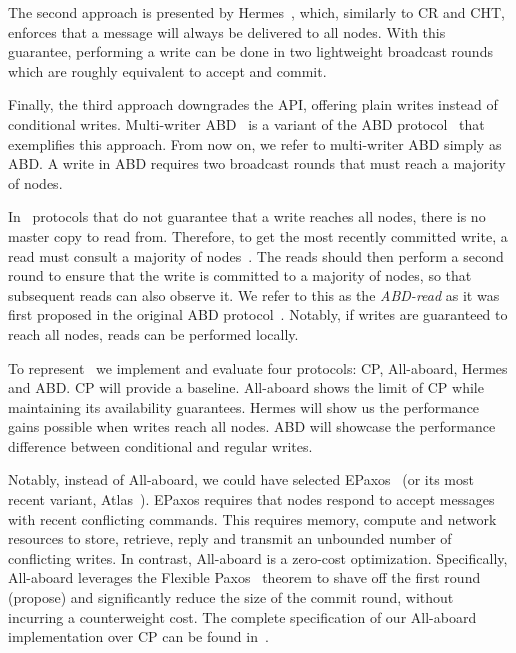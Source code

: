 The second approach is presented by Hermes~\cite{A:2020}, which, similarly to CR and CHT, 
enforces that a message will always be delivered to all nodes. With this guarantee, performing a write can be done in two lightweight broadcast rounds which are roughly equivalent to accept and commit. %


Finally, the third approach downgrades the API, offering plain writes instead of conditional writes.
Multi-writer ABD~\cite{Lynch:1997} is a variant of the ABD protocol~\cite{Attiya:1994} that exemplifies this approach. From now on, we refer to multi-writer ABD simply as ABD. 
A write in ABD requires two broadcast rounds that must reach a majority of nodes.

In \DPKO~protocols that do not guarantee that a write reaches all nodes, 
there is no master copy to read from. 
Therefore, to get the most recently committed write, a read must consult a majority of nodes~\cite{Charapko:2019}. The reads should then perform a second round to ensure that the write is committed to a majority of nodes, so that subsequent reads can also observe it. 
We refer to this as the \emph{ABD-read} as it was first proposed in the original ABD protocol~\cite{Attiya:1994}. Notably, if writes are guaranteed to reach all nodes, reads can be performed locally.

To represent \DPKO~we implement and evaluate four protocols: CP, All-aboard, Hermes and ABD. CP will provide a baseline. 
All-aboard shows the limit of CP while maintaining its availability guarantees.
Hermes will show us the performance gains possible when writes reach all nodes. ABD will showcase the performance difference between conditional and regular writes. 

Notably, instead of All-aboard, we could have selected EPaxos~\cite{Moraru:2013} (or its most recent variant, Atlas~\cite{Enes:2020}). EPaxos requires that nodes respond to accept messages with recent conflicting commands. This requires memory, compute and network resources to store, retrieve, reply and transmit an unbounded number of conflicting writes.
In contrast, All-aboard is a zero-cost optimization. 
Specifically, All-aboard leverages the Flexible Paxos~\cite{Howard:2018} theorem to shave off the first round (propose) and significantly reduce the size of the commit round, without incurring a counterweight cost.
The complete specification of our All-aboard implementation over CP can be found in~\cite{Paxos-spec}.




